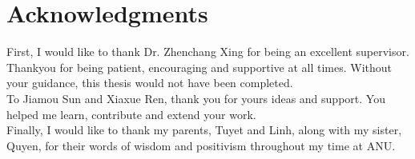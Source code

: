 \chapter*{Acknowledgments}

First, I would like to thank Dr. Zhenchang Xing for being an excellent supervisor. Thankyou for being patient, encouraging and supportive at all times. Without your guidance, this thesis would not have been completed. \\
To Jiamou Sun and Xiaxue Ren, thank you for yours ideas and support. You helped me learn, contribute and extend your work.\\
Finally, I would like to thank my parents, Tuyet and Linh, along with my sister, Quyen, for their words of wisdom and positivism throughout my time at ANU.

